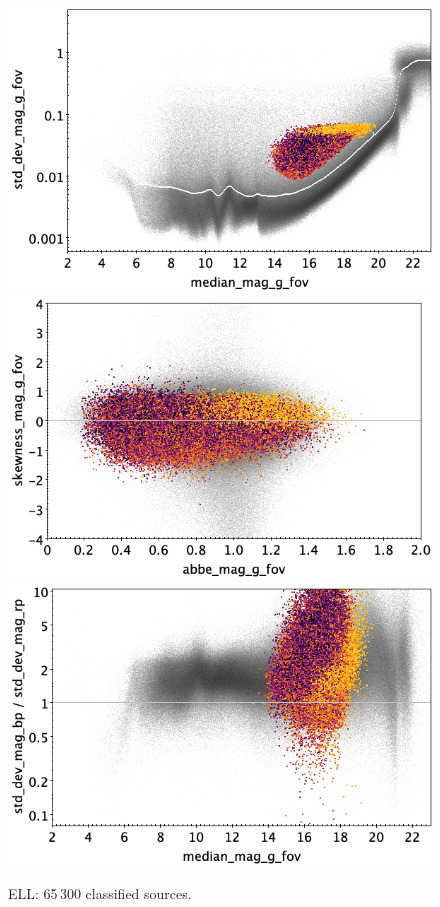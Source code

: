\documentclass[longauth]{aa}
\begin{document}
\begin{appendix}
\begin{figure}
\hspace{2mm}
 \includegraphics[width=0.45\hsize]{figures/appendix/ELL_cls_msd.png} \\ %
\vspace{4mm}
 \includegraphics[width=0.45\hsize]{figures/appendix/ELL_cls_ask.png}  %
\hspace{2mm}
 \includegraphics[width=0.45\hsize]{figures/appendix/ELL_cls_msdr.png}  \\ %
\vspace{4mm}
 \caption{ELL: 65\,300 classified sources.}  
 \label{fig:app:ELL}
\end{figure}


\end{appendix}
\end{document}
